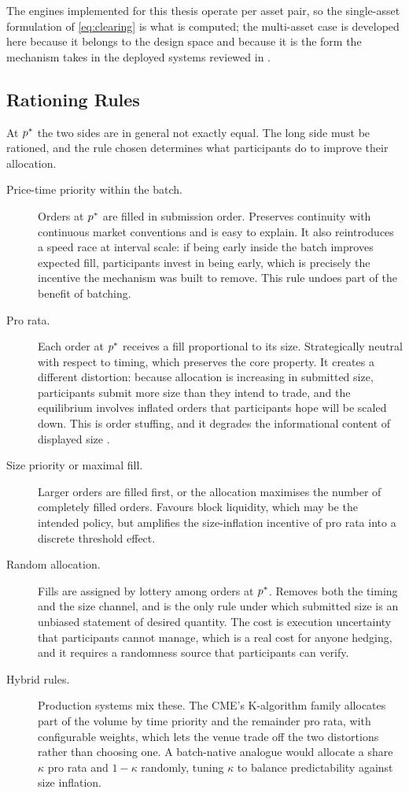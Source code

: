 The engines implemented for this thesis operate per asset pair, so the
single-asset formulation of \eqref{eq:clearing} is what is computed;
the multi-asset case is developed here because it belongs to the design
space and because it is the form the mechanism takes in the deployed
systems reviewed in .

\subsection{Rationing Rules}
\label{sec:rationing}

At $p^{\ast}$ the two sides are in general not exactly equal. The long side
must be rationed, and the rule chosen determines what participants do to
improve their allocation.

\begin{description}
  \item[Price-time priority within the batch.] Orders at $p^{\ast}$ are
  filled in submission order. Preserves continuity with continuous
  market conventions and is easy to explain. It also reintroduces a
  speed race at interval scale: if being early inside the batch improves
  expected fill, participants invest in being early, which is precisely
  the incentive the mechanism was built to remove. This rule undoes part
  of the benefit of batching.
  \item[Pro rata.] Each order at $p^{\ast}$ receives a fill proportional to
  its size. Strategically neutral with respect to timing, which
  preserves the core property. It creates a different distortion:
  because allocation is increasing in submitted size, participants
  submit more size than they intend to trade, and the equilibrium
  involves inflated orders that participants hope will be scaled down.
  This is order stuffing, and it degrades the informational content of
  displayed size \citep{haynes2020precedence}.
  \item[Size priority or maximal fill.] Larger orders are filled first,
  or the allocation maximises the number of completely filled orders.
  Favours block liquidity, which may be the intended policy, but
  amplifies the size-inflation incentive of pro rata into a discrete
  threshold effect.
  \item[Random allocation.] Fills are assigned by lottery among orders
  at $p^{\ast}$. Removes both the timing and the size channel, and is the
  only rule under which submitted size is an unbiased statement of
  desired quantity. The cost is execution uncertainty that participants
  cannot manage, which is a real cost for anyone hedging, and it
  requires a randomness source that participants can verify.
  \item[Hybrid rules.] Production systems mix these. The CME's
  K-algorithm family allocates part of the volume by time priority and
  the remainder pro rata, with configurable weights, which lets the
  venue trade off the two distortions rather than choosing one.
  A batch-native analogue would allocate a share $\kappa$ pro rata and
  $1 - \kappa$ randomly, tuning $\kappa$ to balance predictability
  against size inflation.
\end{description}

